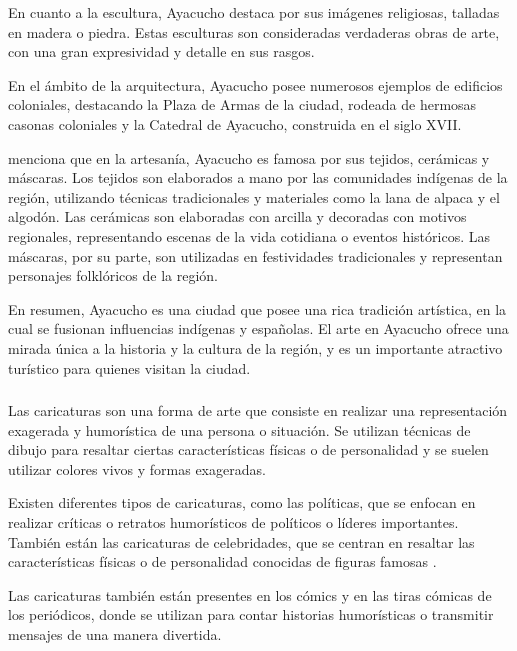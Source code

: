 \documentclass[12pt,a4paper]{article}
\begin{document}
En cuanto a la escultura, Ayacucho destaca por sus imágenes religiosas, talladas en madera o piedra. Estas esculturas son consideradas verdaderas obras de arte, con una gran expresividad y detalle en sus rasgos.

En el ámbito de la arquitectura, Ayacucho posee numerosos ejemplos de edificios coloniales, destacando la Plaza de Armas de la ciudad, rodeada de hermosas casonas coloniales y la Catedral de Ayacucho, construida en el siglo XVII.

\cite{velasco_historia_2008} menciona que en la artesanía, Ayacucho es famosa por sus tejidos, cerámicas y máscaras. Los tejidos son elaborados a mano por las comunidades indígenas de la región, utilizando técnicas tradicionales y materiales como la lana de alpaca y el algodón. Las cerámicas son elaboradas con arcilla y decoradas con motivos regionales, representando escenas de la vida cotidiana o eventos históricos. Las máscaras, por su parte, son utilizadas en festividades tradicionales y representan personajes folklóricos de la región.

En resumen, Ayacucho es una ciudad que posee una rica tradición artística, en la cual se fusionan influencias indígenas y españolas. El arte en Ayacucho ofrece una mirada única a la historia y la cultura de la región, y es un importante atractivo turístico para quienes visitan la ciudad.

\subsubsection{\variablei}%

Las caricaturas son una forma de arte que consiste en realizar una representación exagerada y humorística de una persona o situación. Se utilizan técnicas de dibujo para resaltar ciertas características físicas o de personalidad y se suelen utilizar colores vivos y formas exageradas.

Existen diferentes tipos de caricaturas, como las políticas, que se enfocan en realizar críticas o retratos humorísticos de políticos o líderes importantes. También están las caricaturas de celebridades, que se centran en resaltar las características físicas o de personalidad conocidas de figuras famosas \cite{gray_caricaturas_2015}.

Las caricaturas también están presentes en los cómics y en las tiras cómicas de los periódicos, donde se utilizan para contar historias humorísticas o transmitir mensajes de una manera divertida.
\end{document}
